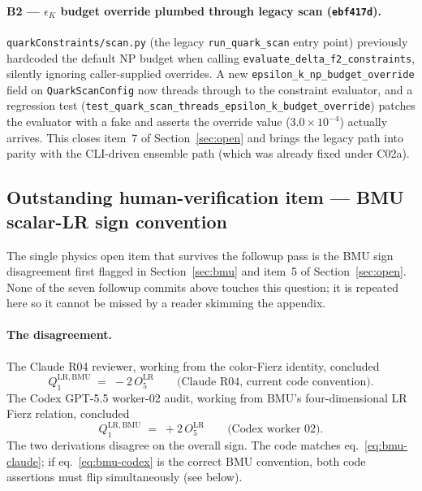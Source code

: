 \documentclass[11pt]{article}
\newcommand{\eK}{\epsilon_K}
\begin{document}
\paragraph{B2 --- $\eK$ budget override plumbed through legacy scan
(\texttt{ebf417d}).}
\texttt{quarkConstraints/scan.py} (the legacy
\texttt{run\_quark\_scan} entry point) previously hardcoded the default
NP budget when calling \texttt{evaluate\_delta\_f2\_constraints},
silently ignoring caller-supplied overrides.  A new
\texttt{epsilon\_k\_np\_budget\_override} field on
\texttt{QuarkScanConfig} now threads through to the constraint
evaluator, and a regression test
(\texttt{test\_quark\_scan\_threads\_epsilon\_k\_budget\_override})
patches the evaluator with a fake and asserts the override value
($3.0\times10^{-4}$) actually arrives.  This closes item~7 of
Section~\ref{sec:open} and brings the legacy path into parity with the
CLI-driven ensemble path (which was already fixed under C02a).

\subsection{Outstanding human-verification item --- BMU scalar-LR sign convention}
\label{sec:open-bmu}

The single physics open item that survives the followup pass is the
BMU sign disagreement first flagged in Section~\ref{sec:bmu} and item~5
of Section~\ref{sec:open}.  None of the seven followup commits above
touches this question; it is repeated here so it cannot be missed by a
reader skimming the appendix.

\paragraph{The disagreement.}
The Claude R04 reviewer, working from the color-Fierz identity, concluded
\begin{equation}\label{eq:bmu-claude}
  Q_1^{\mathrm{LR,BMU}} \;=\; -2\,O_5^{\mathrm{LR}}
  \qquad\text{(Claude R04, current code convention).}
\end{equation}
The Codex GPT-5.5 worker-02 audit, working from BMU's
four-dimensional LR Fierz relation, concluded
\begin{equation}\label{eq:bmu-codex}
  Q_1^{\mathrm{LR,BMU}} \;=\; +2\,O_5^{\mathrm{LR}}
  \qquad\text{(Codex worker 02).}
\end{equation}
The two derivations disagree on the overall sign.  The code matches
eq.~\eqref{eq:bmu-claude}; if eq.~\eqref{eq:bmu-codex} is the correct
BMU convention, both code assertions must flip simultaneously (see below).
\end{document}
